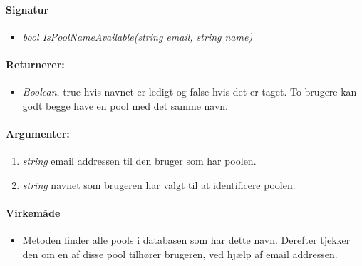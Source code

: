 \paragraph{Signatur}
\begin{itemize}
	\item \textit{bool IsPoolNameAvailable(string email, string name)}
\end{itemize}

\paragraph{Returnerer:}
\begin{itemize}
	\item \textit{Boolean}, true hvis navnet er ledigt og false hvis det er taget. To brugere kan godt begge have en pool med det samme navn.
\end{itemize}

\paragraph{Argumenter:}
\begin{enumerate}
	\item \textit{string} email addressen til den bruger som har poolen.
	\item \textit{string} navnet som brugeren har valgt til at identificere poolen.
\end{enumerate}

\paragraph{Virkemåde}
\begin{itemize}
	\item Metoden finder alle pools i databasen som har dette navn. Derefter tjekker den om en af disse pool tilhører brugeren, ved hjælp af email addressen.
\end{itemize}

